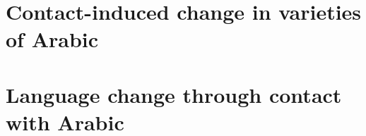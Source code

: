\documentclass[output=book,modfonts,nonflat,collection,collectionchapter
		,colorlinks,citecolor=brown,
		arabicfont
		  ]{langsci/langscibook}
\begin{document}
         
\maketitle                
\frontmatter

\tableofcontents
% 
% 

\mainmatter           
 
\newcommand{\lsCollectionPaperFirstPage}{1}
\newcommand{\lsCollectionPaperLastPage}{1}


 
\part{Contact-induced change in varieties of Arabic}



\part{Language change through contact with Arabic}
\end{document}
